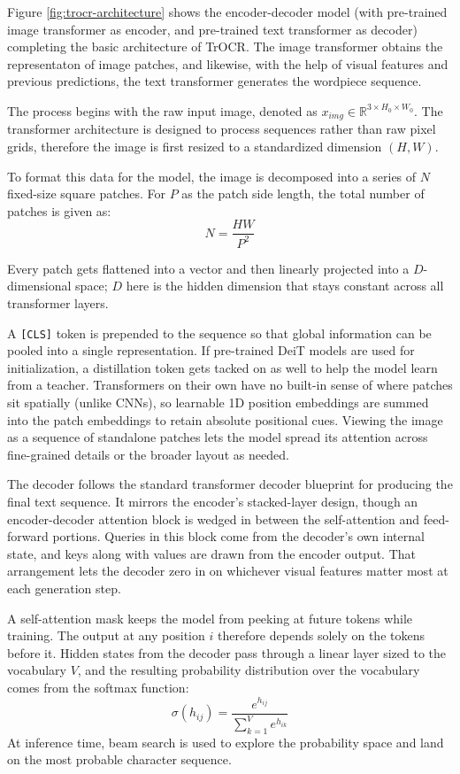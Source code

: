 Figure \ref{fig:trocr-architecture} \cite{li2021trocr} shows the encoder-decoder model (with pre-trained image transformer as encoder, and pre-trained text transformer as decoder) completing the basic architecture of TrOCR. The image transformer obtains the representaton of image patches, and likewise, with the help of visual features and previous predictions, the text transformer generates the wordpiece sequence.

The process begins with the raw input image, denoted as $x_{img} \in \mathbb{R}^{3 \times H_0 \times W_0}$. The transformer architecture is designed to process sequences rather than raw pixel grids, therefore the image is first resized to a standardized dimension $(H, W)$. 

To format this data for the model, the image is decomposed into a series of $N$ fixed-size square patches. For $P$ as the patch side length, the total number of patches is given as:
\[
N = \frac{HW}{P^2}
\]

Every patch gets flattened into a vector and then linearly projected into a $D$-dimensional space; $D$ here is the hidden dimension that stays constant across all transformer layers.

A \texttt{[CLS]} token is prepended to the sequence so that global information can be pooled into a single representation. If pre-trained DeiT models are used for initialization, a distillation token gets tacked on as well to help the model learn from a teacher. Transformers on their own have no built-in sense of where patches sit spatially (unlike CNNs), so learnable 1D position embeddings are summed into the patch embeddings to retain absolute positional cues. Viewing the image as a sequence of standalone patches lets the model spread its attention across fine-grained details or the broader layout as needed.

The decoder follows the standard transformer decoder blueprint for producing the final text sequence. It mirrors the encoder's stacked-layer design, though an encoder-decoder attention block is wedged in between the self-attention and feed-forward portions. Queries in this block come from the decoder's own internal state, and keys along with values are drawn from the encoder output. That arrangement lets the decoder zero in on whichever visual features matter most at each generation step.

A self-attention mask keeps the model from peeking at future tokens while training. The output at any position $i$ therefore depends solely on the tokens before it. Hidden states from the decoder pass through a linear layer sized to the vocabulary $V$, and the resulting probability distribution over the vocabulary comes from the softmax function:
    \[
    \sigma(h_{ij}) = \frac{e^{h_{ij}}}{\sum_{k=1}^{V} e^{h_{ik}}}
    \]
At inference time, beam search is used to explore the probability space and land on the most probable character sequence.


